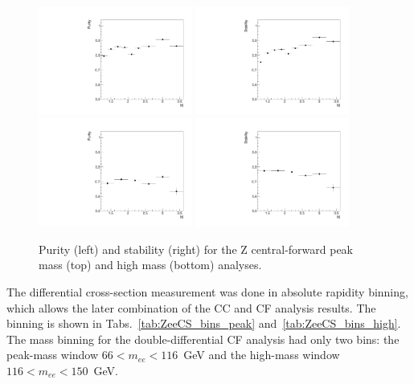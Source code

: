 \begin{figure}
  \centering
  \includegraphics[width=0.45\textwidth]{figures/ZCF_purity_peak}
  \includegraphics[width=0.45\textwidth]{figures/ZCF_stability_peak} \\
  \includegraphics[width=0.45\textwidth]{figures/ZCF_purity_high}
  \includegraphics[width=0.45\textwidth]{figures/ZCF_stability_high} \\
  \caption{Purity (left) and stability (right) for the Z central-forward peak mass (top) and high mass (bottom) analyses.}
  \label{fig:ZeeCS_purity_stability}
\end{figure}

The differential cross-section measurement was done in absolute rapidity binning, which allows the later combination of the CC and CF analysis results. The binning is shown in Tabs.~\ref{tab:ZeeCS_bins_peak} and~\ref{tab:ZeeCS_bins_high}. The mass binning for the double-differential CF analysis had only two bins: the peak-mass window $66 < m_{ee} < 116$~GeV and the high-mass window $116 < m_{ee} < 150$~GeV.

